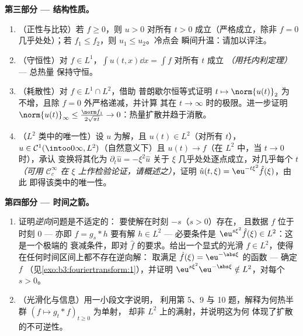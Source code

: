 \begin{problem}[{周末问题 --- $\partial_tu =
\partial^2_{xx}u$，从头到尾求解}]
\medskip
\noindent\textbf{第三部分 --- 结构性质。}
\begin{enumerate}[resume]
  \item （正性与比较）若 $f \geq 0$，则 $u > 0$
        对所有 $t > 0$ 成立（严格成立，除非 $f = 0$ 几乎处处）；若
        $f_1 \leq f_2$，则 $u_1 \leq u_2$。冷点会
        瞬间升温：请加以评注。
  \item （守恒性）对 $f \in L^1$，$\int u(t, x)\dd x =
        \int f$ 对所有 $t$ 成立 \emph{（用托内利定理）} --- 总热量
        保持守恒。
  \item （耗散性）对 $f \in L^1\cap L^2$，借助
        普朗歇尔恒等式证明 $t \mapsto \norm{u(t)}_2$ 为
        不增，且除 $f = 0$ 外严格递减，并计算
        其在 $t \to \infty$ 时的极限。进一步证明
        $\norm{u(t)}_\infty \leq \frac{\norm
        f_1}{2\sqrt{\pi t}} \to 0$：热量扩散并趋于消散。
  \item （$L^2$ 类中的唯一性）设 $u$ 为解，且
        $u(t) \in L^2$（对所有 $t$），$u \in \mathcal
        C^1(\intoo0\infty, L^2)$（自然意义下）且
        $u(t) \to f$（在 $L^2$ 中，当 $t\to0$ 时），承认
        变换将其化为 $\partial_t\hat u =
        -\xi^2\hat u$ 关于 $\xi$ 几乎处处逐点成立，对几乎每个 $t$
        \emph{（可用 $\mathcal
        C_c^\infty$ 在 $\xi$ 上作检验论证，请概述之）}，证明
        $\hat u(t,\xi) = \eu^{-t\xi^2}\hat f(\xi)$，由此
        即得该类中的唯一性。
\end{enumerate}

\medskip
\noindent\textbf{第四部分 --- 时间之箭。}
\begin{enumerate}[resume]
  \item 证明\emph{逆向}问题是不适定的：
        要使解在时刻 $-s$（$s > 0$）存在，
        且数据 $f$ 位于时刻 $0$ --- 亦即 $f = g_s * h$
        要有解 $h \in L^2$ --- 必要条件是
        $\eu^{s\xi^2}\hat f(\xi) \in L^2$：这是一个极端的
        衰减条件，即对 $\hat f$ 的要求。给出一个显式的光滑 $f
        \in L^2$，使得在任何时间区间上都不存在逆向解：
        取满足 $\hat f(\xi) =
        \eu^{-\abs\xi}$ 的函数 --- 确定 $f$
        （见\cref{exo:b3:fouriertransform:1}），并证明
        $\eu^{s\xi^2}\eu^{-\abs\xi} \notin L^2$，对每个 $s >
        0$。
  \item （光滑化与信息）用一小段文字说明，
        利用第 5、9 与 10 题，解释为何热半群
        $(f \mapsto g_t * f)_{t\geq0}$ 为单射，
        却非 $L^2$ 上的满射，并说明这为何
        体现了扩散的不可逆性。
\end{enumerate}


\end{problem}

